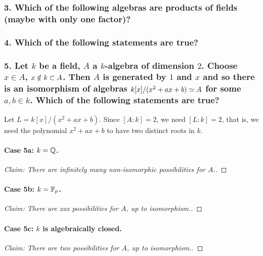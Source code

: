 \subsubsection*{3. Which of the following algebras are products of fields (maybe with only one factor)?}


\subsubsection*{4. Which of the following statements are true?}

\subsubsection*{5. Let $k$ be a field, $A$ a $k$-algebra of dimension $2$. Choose $x \in A$, $x \notin k \subset A$. Then $A$ is generated by $1$ and $x$ and so there is an isomorphism of algebras $k[x]/(x^2 + ax + b) \simeq A$ for some $a, b \in k$. Which of the following statements are true?}

Let $L = k[x] / (x^2 + ax + b)$. Since $[A : k] = 2$, we need $[L : k] = 2$, that is, we need the polynomial $x^2 + ax + b$ to have two distinct roots in $k$.

\paragraph*{Case 5a: $k = \mathbb{Q}$.}
\begin{proof}[Claim: There are \emph{infinitely many} non-isomorphic possibilities for $A$.]

\end{proof}

\paragraph*{Case 5b: $k = \mathbb{F}_p$.}
\begin{proof}[Claim: There are \emph{xxx} possibilities for $A$, up to isomorphism.]

\end{proof}

\paragraph*{Case 5c: $k$ is algebraically closed.}
\begin{proof}[Claim: There are \emph{two} possibilities for $A$, up to isomorphism.]

\end{proof}
